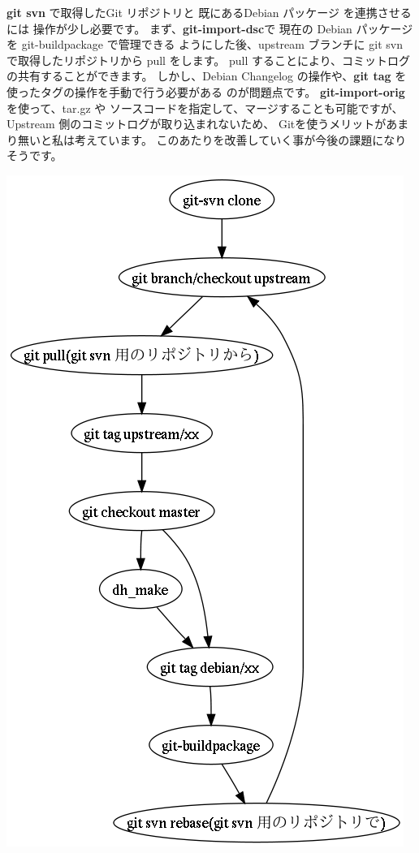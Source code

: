 \documentclass[mingoth,a4paper]{jsarticle}
\begin{document}
\begin{minipage}{0.5\hsize}
{\bf git svn} で取得したGit リポジトリと 既にあるDebian パッケージ を連携させるには
操作が少し必要です。
まず、{\bf git-import-dsc}で 現在の Debian パッケージ を git-buildpackage で管理できる
ようにした後、upstream ブランチに git svn で取得したリポジトリから pull をします。
pull することにより、コミットログの共有することができます。
しかし、Debian Changelog の操作や、{\bf git tag} を使ったタグの操作を手動で行う必要がある
のが問題点です。
{\bf git-import-orig } を使って、tar.gz や ソースコードを指定して、マージすることも可能ですが、
Upstream 側のコミットログが取り込まれないため、 Gitを使うメリットがあまり無いと私は考えています。
このあたりを改善していく事が今後の課題になりそうです。
\end{minipage}
\begin{minipage}{0.5\hsize}
\includegraphics[width=0.8\hsize]{image200804/git-svn_with_build-package.png}
\end{minipage}
\end{document}
